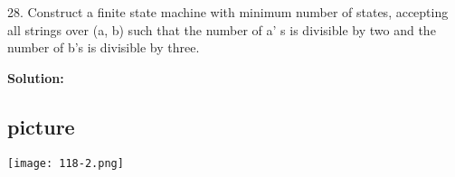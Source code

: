 \documentclass[a4,9pt]{beamer}
\begin{document}
\begin{frame}
28. Construct a finite state machine with minimum number of states, accepting all strings over (a, b)
such that the number of a' s is divisible by two and the number of b's is divisible by three.\\
\begin{flushright}
  [GATE 1997]
\end{flushright}

\pause
\textbf{Solution:}\\
\begin{center}
\section{picture}
\texttt{[image: 118-2.png]}
\end{center}
\end{frame}
\end{document}
